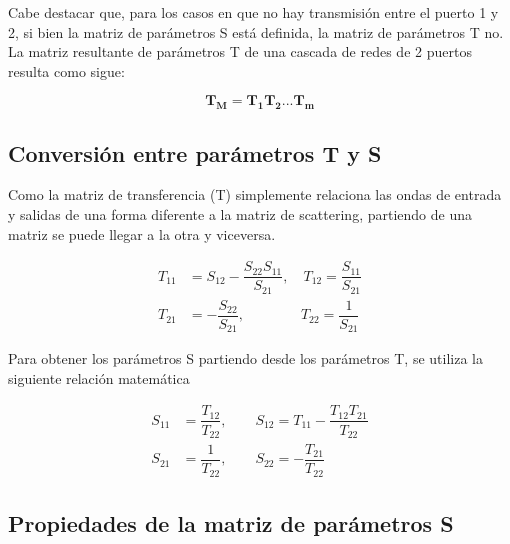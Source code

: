 Cabe destacar que, para los casos en que no hay transmisión entre el puerto 1 y 2, si bien la matriz de parámetros S está definida, 
la matriz de parámetros T no. La matriz resultante de parámetros T de una cascada de redes de 2 puertos resulta como sigue:

\begin{equation}
\mathbf{T_M=T_1T_2...T_m}
\end{equation}

\subsection{Conversión entre parámetros T y S}

Como la matriz de transferencia (T) simplemente relaciona las ondas de entrada y salidas de una forma diferente a la matriz de 
scattering, partiendo de una matriz se puede llegar a la otra y viceversa.

\begin{equation}
	\begin{aligned}
		T_{11} &= S_{12} - \dfrac{S_{22}S_{11}}{S_{21}},\quad T_{12} = \dfrac{S_{11}}{S_{21}} \\
		T_{21} &= - \dfrac{S_{22}}{S_{21}},\qquad\qquad T_{22} = \dfrac{1}{S_{21}}
	\end{aligned}
\end{equation}

Para obtener los parámetros S partiendo desde los parámetros T, se utiliza la siguiente relación matemática

\begin{equation}
	\begin{aligned}
		S_{11} &= \dfrac{T_{12}}{T_{22}},\qquad S_{12} = T_{11} - \dfrac{T_{12}T_{21}}{T_{22}} \\
		S_{21} &= \dfrac{1}{T_{22}},\qquad S_{22} = - \dfrac{T_{21}}{T_{22}}
	\end{aligned}
\end{equation}


\subsection{Propiedades de la matriz de parámetros S}

